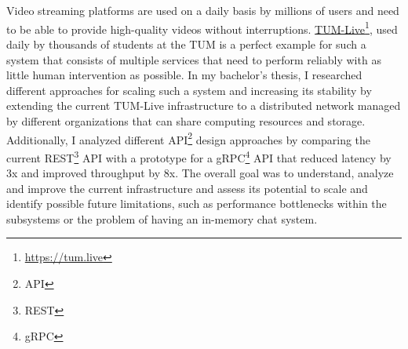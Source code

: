 \chapter{\abstractname}

Video streaming platforms are used on a daily basis by millions of users and need to be able to provide high-quality videos without interruptions. \href{https://tum.live}{TUM-Live}\footnote{\url{https://tum.live}}, used daily by thousands of students at the \ac{TUM} is a perfect example for such a system that consists of multiple services that need to perform reliably with as little human intervention as possible.
In my bachelor's thesis, I researched different approaches for scaling such a system and increasing its stability by extending the current TUM-Live infrastructure to a distributed network managed by different organizations that can share computing resources and storage. Additionally, I analyzed different API\footnote{\ac{API}} design approaches by comparing the current REST\footnote{\ac{REST}} \ac{API} with a prototype for a gRPC\footnote{\ac{gRPC}} \ac{API} that reduced latency by 3x and improved throughput by 8x. The overall goal was to understand, analyze and improve the current infrastructure and assess its potential to scale and identify possible future limitations, such as performance bottlenecks within the subsystems or the problem of having an in-memory chat system.
